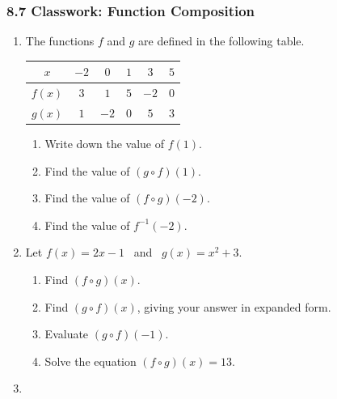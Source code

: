 \documentclass[12pt, twoside]{article}
\begin{document}
\subsubsection*{8.7 Classwork: Function Composition}

\begin{enumerate}[itemsep=0.15cm]

\item[1.]

The functions $f$ and $g$ are defined in the following table.

\begin{center}
\begin{tabular}{|c|c|c|c|c|c|}
\hline
$x$ & $-2$ & $0$ & $1$ & $3$ & $5$ \\ \hline
$f(x)$ & $3$ & $1$ & $5$ & $-2$ & $0$ \\ \hline
$g(x)$ & $1$ & $-2$ & $0$ & $5$ & $3$ \\ \hline
\end{tabular}
\end{center}

\begin{enumerate}[itemsep=0.15cm]
  \item Write down the value of $f(1)$. \vfill
  \item Find the value of $(g \circ f)(1)$. \vfill
  \item Find the value of $(f \circ g)(-2)$. \vfill
  \item Find the value of $f^{-1}(-2)$. \vfill
\end{enumerate}

\newpage

\item[2.]

Let $f(x) = 2x - 1$ \ and \ $g(x) = x^2 + 3$.

\begin{enumerate}[itemsep=0.15cm]
  \item Find $(f \circ g)(x)$. \vfill
  \item Find $(g \circ f)(x)$, giving your answer in expanded form. \vfill
  \item Evaluate $(g \circ f)(-1)$. \vfill
  \item Solve the equation $(f \circ g)(x) = 13$. \vfill
\end{enumerate}

\newpage

\item[3.]


\end{enumerate}
\end{document}
